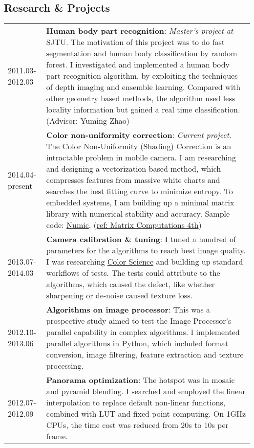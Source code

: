 \documentclass[10pt, a4paper]{article}
\begin{document}
\subsection*{Research \& Projects}
\label{sec-1-4}
\begin{longtabu} spread \linewidth {lX}
2011.03-2012.03 & \textbf{Human body part recognition}: \emph{Master's project at} SJTU. The motivation of this project was to do fast segmentation and human body classification by random forest. I investigated and implemented a human body part recognition algorithm, by exploiting the techniques of depth imaging and ensemble learning. Compared with other geometry based methods, the algorithm used less locality information but gained a real time classification. (Advisor: Yuming Zhao)\\
2014.04-present & \textbf{Color non-uniformity correction}: \emph{Current project}. The Color Non-Uniformity (Shading) Correction is an intractable problem in mobile camera. I am researching and designing a vectorization based method, which compresses features from massive white charts and searches the best fitting curve to minimize entropy. To embedded systems, I am building up a minimal matrix library with numerical stability and accuracy. Sample code: {\href{https://github.com/penglin03/Numic}{Numic}}, ({\href{https://jhupbooks.press.jhu.edu/content/matrix-computations-0}{ref: Matrix Computations 4th}})\\
2013.07-2014.03 & \textbf{Camera calibration \& tuning}: I tuned a hundred of parameters for the algorithms to reach best image quality. I was researching {\href{http://www.amazon.com/Introduction-Color-Imaging-Science-Hsien-Che/dp/0521103134}{Color Science}} and building up standard workflows of tests. The tests could attribute to the algorithms, which caused the defect, like whether sharpening or de-noise caused texture loss.\\
2012.10-2013.06 & \textbf{Algorithms on image processor}: This was a prospective study aimed to test the Image Processor's parallel capability in complex algorithms. I implemented parallel algorithms in Python, which included format conversion, image filtering, feature extraction and texture processing.\\
2012.07-2012.09 & \textbf{Panorama optimization}: The hotspot was in mosaic and pyramid blending. I searched and employed the linear interpolation to replace default non-linear functions, combined with LUT and fixed point computing. On 1GHz CPUs, the time cost was reduced from 20s to 10s per frame.\\
\end{longtabu}
\end{document}
